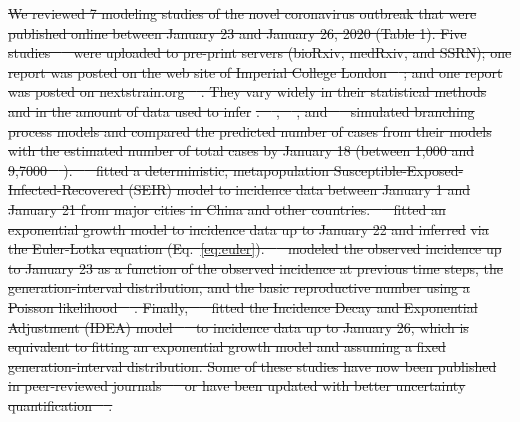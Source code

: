 \documentclass[12pt]{article}
\newcommand{\eref}[1]{Eq.~\ref{eq:#1}}
\newcommand{\Ro}{\ensuremath{{\mathcal R}_{0}}\xspace}
\providecommand{\DIFdeltex}[1]{{\protect\color{red}\sout{#1}}}                      %
\providecommand{\DIFdel}[1]{\texorpdfstring{\DIFdeltex{#1}}{}} %
\begin{document}
\DIFdel{We reviewed 7 modeling studies of the novel coronavirus outbreak that were published online between January 23 and January 26, 2020 (Table 1).
Five studies \mbox{%
\citep{liuncov, majumderncov, readncov, riouncov, zhaoncov} }\hspace{0pt}%
were uploaded to pre-print servers (bioRxiv, medRxiv, and SSRN); one report was posted on the web site of Imperial College London \mbox{%
\citep{imaincov}}\hspace{0pt}%
; and one report was posted on nextstrain.org \mbox{%
\citep{bedfordncov}}\hspace{0pt}%
.
They vary widely in their statistical methods and in the amount of data used to infer }%
\DIFdel{.
\mbox{%
\cite{bedfordncov}}\hspace{0pt}%
, \mbox{%
\cite{imaincov}}\hspace{0pt}%
, and \mbox{%
\cite{riouncov} }\hspace{0pt}%
simulated branching process models and compared the predicted number of cases from their models with the estimated number of total cases by January 18 (between 1,000 and 9,7000 \mbox{%
\citep{imaincov0}}\hspace{0pt}%
).
\mbox{%
\cite{readncov} }\hspace{0pt}%
fitted a deterministic, metapopulation Susceptible-Exposed-Infected-Recovered (SEIR) model to incidence data between January 1 and January 21 from major cities in China and other countries.
\mbox{%
\cite{zhaoncov} }\hspace{0pt}%
fitted an exponential growth model to incidence data up to January 22 and inferred }%
\DIFdel{via the Euler-Lotka equation (\eref{euler}).
\mbox{%
\cite{liuncov} }\hspace{0pt}%
modeled the observed incidence up to January 23 as a function of the observed incidence at previous time steps, the generation-interval distribution, and the basic reproductive number using a Poisson likelihood \mbox{%
\citep{forsberg2008likelihood}}\hspace{0pt}%
.
Finally, \mbox{%
\cite{majumderncov} }\hspace{0pt}%
fitted the Incidence Decay and Exponential Adjustment (IDEA) model \mbox{%
\citep{fisman2013idea} }\hspace{0pt}%
to incidence data up to January 26, which is equivalent to fitting an exponential growth model and assuming a fixed generation-interval distribution.
Some of these studies have now been published in peer-reviewed journals \mbox{%
\citep{riou2020pattern, zhao2020preliminary} }\hspace{0pt}%
or have been updated with better uncertainty quantification \mbox{%
\citep{readncov2}}\hspace{0pt}%
.
}%
\end{document}
